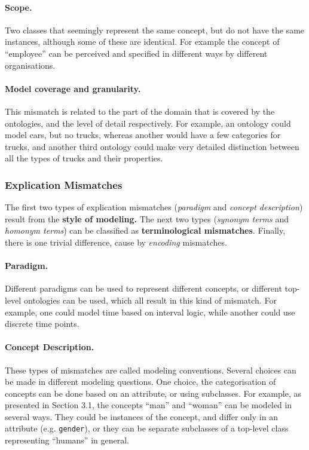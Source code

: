 \paragraph{Scope.}

Two classes that seemingly represent the same concept, but do not have
the same instances, although some of these are identical. For example
the concept of {\textquotedblleft}employee{\textquotedblright} can be
perceived and specified in different ways by different organisations. 

\paragraph{Model coverage and granularity.}
This mismatch is related to the part of the domain that is covered by
the ontologies, and the level of detail respectively. For example, an
ontology could model cars, but no trucks, whereas another would have a
few categories for trucks, and another third ontology could make very
detailed distinction between all the types of trucks and their
properties. 

\subsubsection{Explication Mismatches}
The first two types of explication mismatches (\textit{paradigm} and
\textit{concept description}) result from the \textbf{style of
modeling.} The next two types (\textit{synonym terms} and
\textit{homonym terms}) can be classified as \textbf{terminological
mismatches}. Finally, there is one trivial difference, cause by
\textit{encoding} mismatches. 

\paragraph{Paradigm.}
Different paradigms can be used to represent different concepts, or
different top-level ontologies can be used, which all result in this
kind of mismatch. For example, one could model time based on interval
logic, while another could use discrete time points. 

\paragraph{Concept Description.}
These types of mismatches are called modeling conventions. Several
choices can be made in different modeling questions. One choice, the
categorisation of concepts can be done based on an attribute, or using
subclasses. For example, as presented in Section 3.1, the concepts
{\textquotedblleft}man{\textquotedblright} and
{\textquotedblleft}woman{\textquotedblright} can be modeled in several
ways. They could be instances of the concept, and differ only in an
attribute (e.g. \texttt{gender}), or they can be separate
subclasses of a top-level class representing
{\textquotedblleft}humans{\textquotedblright} in general. 

